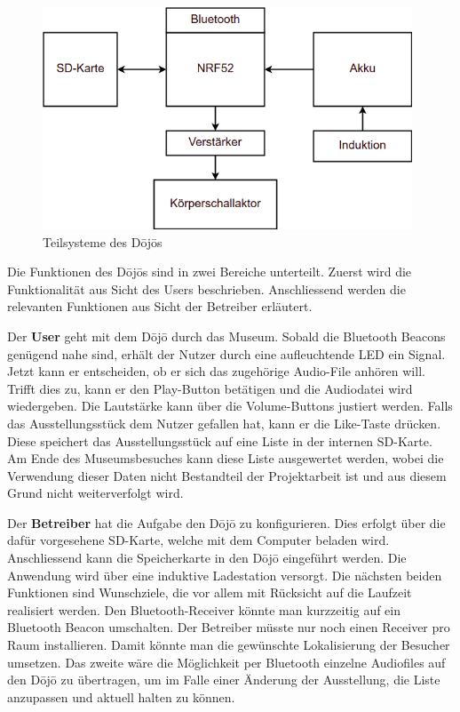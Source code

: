 \begin{figure}[H]
	\begin{center}
		\includegraphics[width=110mm]{data/Loesungskonzept_Teilsysteme.png}
		\caption{Teilsysteme des Dōjōs} %
		\label{fig:Teilsysteme}
	\end{center}
\end{figure}

Die Funktionen des Dōjōs sind in zwei Bereiche unterteilt. Zuerst wird die Funktionalität aus Sicht des Users beschrieben. Anschliessend werden die relevanten Funktionen aus Sicht der Betreiber erläutert.

Der \textbf{User} geht mit dem Dōjō durch das Museum. Sobald die Bluetooth Beacons genügend nahe sind, erhält der Nutzer durch eine aufleuchtende LED ein Signal. Jetzt kann er entscheiden, ob er sich das zugehörige Audio-File anhören will. Trifft dies zu, kann er den Play-Button betätigen und die Audiodatei wird wiedergeben. Die Lautstärke kann über die Volume-Buttons justiert werden. Falls das Ausstellungsstück dem Nutzer gefallen hat, kann er die \glqq Like\grqq-Taste drücken. Diese speichert das Ausstellungsstück auf eine Liste in der internen SD-Karte. Am Ende des Museumsbesuches kann diese Liste ausgewertet werden, wobei die Verwendung dieser Daten nicht Bestandteil der Projektarbeit ist und aus diesem Grund nicht weiterverfolgt wird.

Der \textbf{Betreiber} hat die Aufgabe den Dōjō zu konfigurieren. Dies erfolgt über die dafür vorgesehene SD-Karte, welche mit dem Computer beladen wird. Anschliessend kann die Speicherkarte in den Dōjō eingeführt werden. Die Anwendung wird über eine induktive Ladestation versorgt. Die nächsten beiden Funktionen sind Wunschziele, die vor allem mit Rücksicht auf die Laufzeit realisiert werden. Den Bluetooth-Receiver könnte man kurzzeitig auf ein Bluetooth Beacon umschalten. Der Betreiber müsste nur noch einen Receiver pro Raum installieren. Damit könnte man die gewünschte Lokalisierung der Besucher umsetzen. Das zweite wäre die Möglichkeit per Bluetooth einzelne Audiofiles auf den Dōjō zu übertragen, um im Falle einer Änderung der Ausstellung, die Liste anzupassen und aktuell halten zu können.

